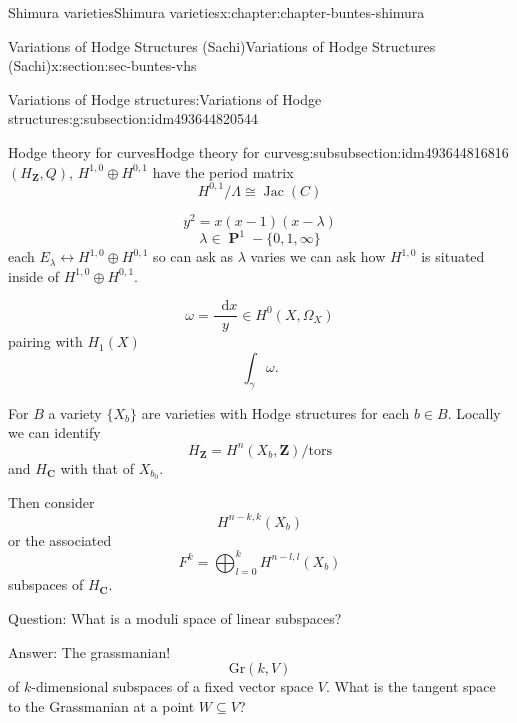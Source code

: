 \documentclass[oneside,10pt,]{book}
\numberwithin{equation}{section}
\newcommand{\diff}{\mathop{}\!\mathrm{d}}
\newcommand{\ZZ}{\mathbf{Z}}
\newcommand{\CC}{\mathbf{C}}
\newcommand{\tors}{\mathrm{tors}}
\DeclareMathOperator{\Jac}{Jac}
\DeclareMathOperator{\PP}{\mathbf{P}}
\begin{document}
\begin{chapterptx}{Shimura varieties}{}{Shimura varieties}{}{}{x:chapter:chapter-buntes-shimura}
\begin{sectionptx}{Variations of Hodge Structures (Sachi)}{}{Variations of Hodge Structures (Sachi)}{}{}{x:section:sec-buntes-vhs}
\begin{subsectionptx}{Variations of Hodge structures:}{}{Variations of Hodge structures:}{}{}{g:subsection:idm493644820544}
%
%
\typeout{************************************************}
\typeout{************************************************}
%
\begin{subsubsectionptx}{Hodge theory for curves}{}{Hodge theory for curves}{}{}{g:subsubsection:idm493644816816}
\((H_\ZZ, Q)\), \(H^{1,0} \oplus H^{0,1}\) have the period matrix%
\begin{equation*}
H^{0,1}/\Lambda \cong \Jac(C)
\end{equation*}
%
\par
%
\begin{equation*}
y^2 = x(x-1)(x-\lambda)
\end{equation*}
%
\begin{equation*}
\lambda \in \PP^1 - \{0,1,\infty\}
\end{equation*}
each \(E_\lambda \leftrightarrow H^{1,0} \oplus H^{0,1}\) so can ask as \(\lambda\) varies we can ask how \(H^{1,0}\) is situated inside of \(H^{1,0} \oplus H^{0,1}\).%
\par
%
\begin{equation*}
\omega = \frac{\diff x}{y} \in H^0(X,\Omega_X)
\end{equation*}
pairing with \(H_1(X)\)%
\begin{equation*}
\int_\gamma \omega\text{.}
\end{equation*}
%
\par
For \(B\) a variety \(\{X_b\}\) are varieties with Hodge structures for each \(b\in B\). Locally we can identify%
\begin{equation*}
H_\ZZ = H^n(X_b , \ZZ)/\tors
\end{equation*}
and \(H_\CC \) with that of \(X_{b_0}\).%
\par
Then consider%
\begin{equation*}
H^{n-k, k}(X_b)
\end{equation*}
or the associated%
\begin{equation*}
F^k = \bigoplus_{l=0}^k H^{n-l,l}(X_b)
\end{equation*}
subspaces of \(H_\CC\).%
\par
Question: What is a moduli space of linear subspaces?%
\par
Answer: The grassmanian!%
\begin{equation*}
{\mathrm{Gr}}(k,V)
\end{equation*}
of \(k\)-dimensional subspaces of a fixed vector space \(V\). What is the tangent space to the Grassmanian at a point \(W\subseteq V\)?%

\end{subsubsectionptx}
\end{subsectionptx}
\end{sectionptx}
\end{chapterptx}
\end{document}
